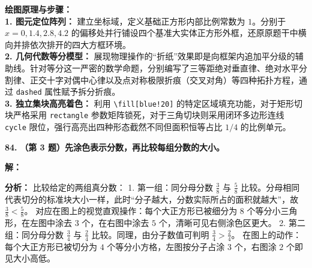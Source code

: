 \documentclass[12pt, a4paper]{ctexrep}
\begin{document}
\vspace{0.4cm}
{\small\color{blue!70!black}
\textbf{绘图原理与步骤：}\\
\textbf{1. 图元定位阵列：} 建立坐标域，定义基础正方形内部比例常数为 $1$。分别于 $x=0, 1.4, 2.8, 4.2$ 的偏移处并行铺设四个基准大实体正方形外框，还原原题干中横向并排依次排开的四大方框环境。\\
\textbf{2. 几何代数等分模型：} 展现物理操作的“折纸”效果即是向框架内追加平分级的辅助线。针对等分这一严密的数学命题，分别编写了三等距绝对垂直律、绝对水平分割律、正交十字对偶中心律以及点对称极限折痕（交叉对角）等四种拓扑方程，通过 \texttt{dashed} 属性赋予拆分折痕。\\
\textbf{3. 独立集块高亮着色：} 利用 \texttt{\textbackslash fill[blue!20]} 的特定区域填充功能，对于矩形切块严格采用 \texttt{rectangle} 参数矩阵锁死，对于三角切块则采用闭环多边形连线 \texttt{cycle} 限位，强行高亮出四种形态截然不同但面积恒等占比 $1/4$ 的比例单元。
}


\vspace{1.5cm}

\textbf{\LARGE 84.} \textbf{（第 3 题）先涂色表示分数，再比较每组分数的大小。}

\vspace{0.4cm}
\textbf{解：}

\textbf{分析：}
比较给定的两组真分数：
1. 第一组：同分母分数 $\displaystyle\frac{3}{8}$ 与 $\displaystyle\frac{5}{8}$ 比较。分母相同代表切分的标准块大小一样，此时“分子越大，分数实际所占的面积就越大”，故 $\displaystyle\frac{3}{8} < \displaystyle\frac{5}{8}$。
对应在图上的视觉直观操作：每个大正方形已被细分为 $8$ 个等分小三角形，在左图中涂去 $3$ 个，在右图中涂去 $5$ 个，清晰可见右侧涂色区更大。
2. 第二组：同分母分数 $\displaystyle\frac{3}{4}$ 与 $\displaystyle\frac{2}{4}$ 比较。同理，由分子数值可判明 $\displaystyle\frac{3}{4} > \displaystyle\frac{2}{4}$。
在图上的动作：每个大正方形已被切分为 $4$ 个等分小方格，左图按分子占涂 $3$ 个，右图涂 $2$ 个即见大小高低。
\end{document}
